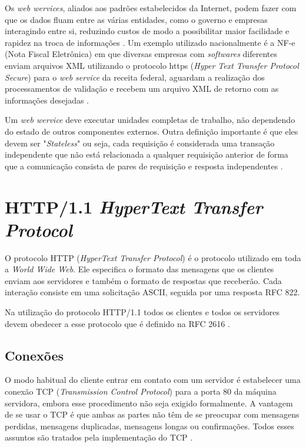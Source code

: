 Os \textit{web wervices}, aliados aos padrões estabelecidos da Internet, podem fazer com que os dados fluam entre as várias entidades, como o governo e empresas interagindo entre si, reduzindo custos de modo a possibilitar maior facilidade e rapidez na troca de informações \cite{Abinader:2006}. Um exemplo utilizado nacionalmente é a NF-e (Nota Fiscal Eletrônica) em que diversas empresas com \textit{softwares} diferentes enviam arquivos XML utilizando o protocolo https (\textit{Hyper Text Transfer Protocol Secure}) para o \textit{web service} da receita federal, aguardam a realização dos processamentos de validação e recebem um arquivo XML de retorno com as informações desejadas \cite{nfe:2006}.

Um \textit{web wervice} deve executar unidades completas de trabalho, não dependendo do estado de outros componentes externos. Outra definição importante é que eles devem ser "\textit{Stateless}" ou seja, cada requisição é considerada uma transação independente que não está relacionada a qualquer requisição anterior de forma que a comunicação consista de pares de requisição e resposta independentes \cite{Sampaio:2003, W3C:2001}.


\section{HTTP/1.1 \textit{HyperText Transfer Protocol}} \label{sec:Http}

O protocolo HTTP (\textit{HyperText Transfer Protocol}) é o protocolo utilizado em toda a \textit{World Wide Web}. Ele especifica o formato das mensagens que os clientes enviam aos servidores e também o formato de respostas que receberão. Cada interação consiste em uma solicitação ASCII, seguida por uma resposta RFC 822. 

Na utilização do protocolo HTTP/1.1 todos os clientes e todos os servidores devem obedecer a esse protocolo que é definido na RFC 2616 \cite{Tanenbaum:2003}.

\subsection{Conexões} \label{HTTP/1.1 - HyperText Transfer Protocol}

O modo habitual do cliente entrar em contato com um servidor é estabelecer uma conexão TCP (\textit{Transmission Control Protocol}) para a porta 80 da máquina servidora, embora esse procedimento não seja exigido formalmente. A vantagem de se usar o TCP é que ambas as partes não têm de se preocupar com mensagens perdidas, mensagens duplicadas, mensagens longas ou confirmações. Todos esses assuntos são tratados pela implementação do TCP \cite{Tanenbaum:2003}.

